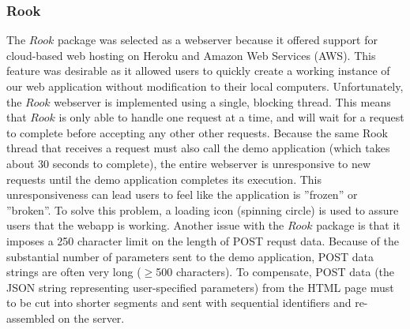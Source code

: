 \subsubsection{Rook}
The $Rook$ package was selected as a webserver because it offered support for cloud-based web hosting on Heroku and Amazon Web Services (AWS).  This feature was desirable as it allowed users to quickly create a working instance of our web application without modification to their local computers.  Unfortunately, the $Rook$ webserver is implemented using a single, blocking thread.  This means that $Rook$ is only able to handle one request at a time, and will wait for a request to complete before accepting any other other requests.  Because the same Rook thread that receives a request must also call the demo application (which takes about 30 seconds to complete), the entire webserver is unresponsive to new requests until the demo application completes its execution.  This unresponsiveness can lead users to feel like the application is ''frozen'' or ''broken''.  To solve this problem, a loading icon (spinning circle) is used to assure users that the webapp is working.  Another issue with the $Rook$ package is that it imposes a 250 character limit on the length of POST requst data.  Because of the substantial number of parameters sent to the demo application, POST data strings are often very long ($\ge$500 characters).  To compensate, POST data (the JSON string representing user-specified parameters) from the HTML page must to be cut into shorter segments and sent with sequential identifiers and re-assembled on the server.

